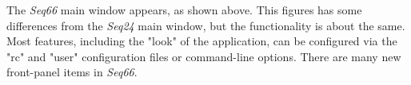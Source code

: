 \documentclass[
 11pt,
 twoside,
 a4paper,
 headinclude,
 footinclude,
 final                                 %
]{article}
\begin{document}


   The \textsl{Seq66} main window appears, as shown above.
   This figures has some differences from the \textsl{Seq24} main window,
   but the functionality is about the same.
   Most features, including the "look" of the application,
   can be configured via the "rc" and "user"
   configuration files or command-line options.
   There are many new front-panel items in \textsl{Seq66}.

\end{document}
